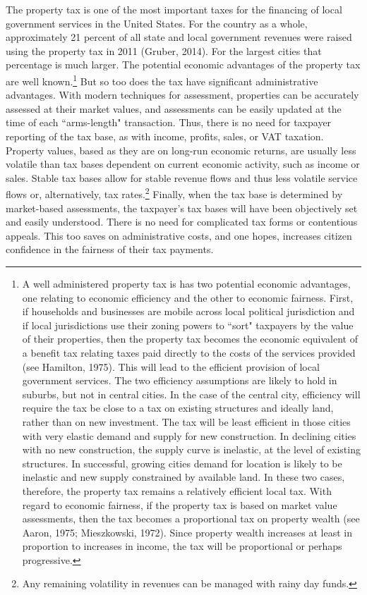\documentclass[12pt,titlepage]{article}
\begin{document}
The property tax is one of the most important taxes for the
financing of local government services in the United States.  For the
country as a whole, approximately 21 percent of all state and local government
revenues were raised using the property tax in 2011 (Gruber, 2014).  For the largest 
cities that percentage is much larger.  The potential economic advantages of the property tax are
well known.\footnote{A well administered property tax is has two
  potential economic advantages, one relating to economic efficiency
  and the other to economic fairness.  First, if households and
  businesses are mobile across local political jurisdiction and if
  local jurisdictions use their zoning powers to ``sort" taxpayers by
  the value of their properties, then the property tax becomes the
  economic equivalent of a benefit tax relating taxes paid directly to
  the costs of the services provided (see Hamilton, 1975).  This will
  lead to the efficient provision of local government services.  The
  two efficiency assumptions are likely to hold in suburbs, but not in
  central cities.  In the case of the central city, efficiency will
  require the tax be close to a tax on existing structures and ideally
  land, rather than on new investment.  The tax will be least
  efficient in those cities with very elastic demand and supply for
  new construction.  In declining cities with no new construction, the
  supply curve is inelastic, at the level of existing structures.  In
  successful, growing cities demand for location is likely to be
  inelastic and new supply constrained by available land.  In these
  two cases, therefore, the property tax remains a relatively
  efficient local tax.  With regard to economic fairness, if the
  property tax is based on market value assessments, then the tax
  becomes a proportional tax on property wealth (see Aaron, 1975; Mieszkowski, 1972).  
Since property wealth increases at least in proportion to increases in income, the tax will be proportional or
perhaps progressive.}  But so too does the tax have significant
administrative advantages.  With modern techniques for assessment,
properties can be accurately assessed at their market values, and
assessments can be easily updated at the time of each ``arms-length"
transaction.  Thus, there is no need for taxpayer reporting of the tax
base, as with income, profits, sales, or VAT taxation.  Property
values, based as they are on long-run economic returns, are usually
less volatile than tax bases dependent on current economic activity,
such as income or sales. Stable tax bases allow for stable revenue
flows and thus less volatile service flows or, alternatively, tax
rates.\footnote{Any remaining volatility in revenues can be managed
  with rainy day funds.} Finally, when the tax base is determined by
market-based assessments, the taxpayer's tax bases will have been
objectively set and easily understood.  There is no need for
complicated tax forms or contentious appeals.  This too saves on
administrative costs, and one hopes, increases citizen confidence in
the fairness of their tax payments.
\end{document}
